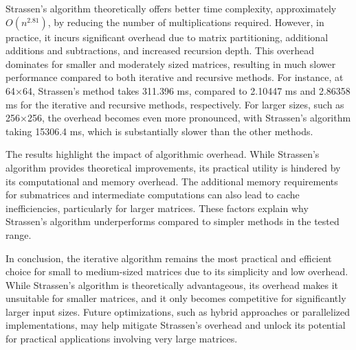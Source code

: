 Strassen’s algorithm theoretically offers better time complexity, approximately 
$O(n^{2.81})$, by reducing the number of multiplications required. However, in practice, it incurs significant overhead due to matrix partitioning, additional additions and subtractions, and increased recursion depth. This overhead dominates for smaller and moderately sized matrices, resulting in much slower performance compared to both iterative and recursive methods. For instance, at 
64×64, Strassen’s method takes 311.396 ms, compared to 2.10447 ms and 2.86358 ms for the iterative and recursive methods, respectively. For larger sizes, such as 
256×256, the overhead becomes even more pronounced, with Strassen's algorithm taking 15306.4 ms, which is substantially slower than the other methods.

The results highlight the impact of algorithmic overhead. While Strassen's algorithm provides theoretical improvements, its practical utility is hindered by its computational and memory overhead. The additional memory requirements for submatrices and intermediate computations can also lead to cache inefficiencies, particularly for larger matrices. These factors explain why Strassen's algorithm underperforms compared to simpler methods in the tested range.

In conclusion, the iterative algorithm remains the most practical and efficient choice for small to medium-sized matrices due to its simplicity and low overhead. While Strassen’s algorithm is theoretically advantageous, its overhead makes it unsuitable for smaller matrices, and it only becomes competitive for significantly larger input sizes. Future optimizations, such as hybrid approaches or parallelized implementations, may help mitigate Strassen’s overhead and unlock its potential for practical applications involving very large matrices.

